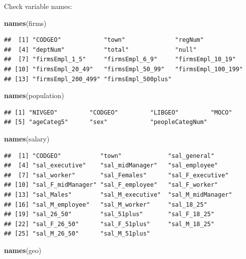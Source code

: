 \documentclass[]{article}
\newenvironment{Shaded}{\begin{snugshade}}{\end{snugshade}}
\newcommand{\KeywordTok}[1]{\textcolor[rgb]{0.13,0.29,0.53}{\textbf{#1}}}
\newcommand{\NormalTok}[1]{#1}
\begin{document}
Check variable names:

\begin{Shaded}
\begin{Highlighting}[]
\KeywordTok{names}\NormalTok{(firms) }
\end{Highlighting}
\end{Shaded}

\begin{verbatim}
##  [1] "CODGEO"            "town"              "regNum"           
##  [4] "deptNum"           "total"             "null"             
##  [7] "firmsEmpl_1_5"     "firmsEmpl_6_9"     "firmsEmpl_10_19"  
## [10] "firmsEmpl_20_49"   "firmsEmpl_50_99"   "firmsEmpl_100_199"
## [13] "firmsEmpl_200_499" "firmsEmpl_500plus"
\end{verbatim}

\begin{Shaded}
\begin{Highlighting}[]
\KeywordTok{names}\NormalTok{(population)}
\end{Highlighting}
\end{Shaded}

\begin{verbatim}
## [1] "NIVGEO"         "CODGEO"         "LIBGEO"         "MOCO"          
## [5] "ageCateg5"      "sex"            "peopleCategNum"
\end{verbatim}

\begin{Shaded}
\begin{Highlighting}[]
\KeywordTok{names}\NormalTok{(salary)}
\end{Highlighting}
\end{Shaded}

\begin{verbatim}
##  [1] "CODGEO"           "town"             "sal_general"     
##  [4] "sal_executive"    "sal_midManager"   "sal_employee"    
##  [7] "sal_worker"       "sal_Females"      "sal_F_executive" 
## [10] "sal_F_midManager" "sal_F_employee"   "sal_F_worker"    
## [13] "sal_Males"        "sal_M_executive"  "sal_M_midManager"
## [16] "sal_M_employee"   "sal_M_worker"     "sal_18_25"       
## [19] "sal_26_50"        "sal_51plus"       "sal_F_18_25"     
## [22] "sal_F_26_50"      "sal_F_51plus"     "sal_M_18_25"     
## [25] "sal_M_26_50"      "sal_M_51plus"
\end{verbatim}

\begin{Shaded}
\begin{Highlighting}[]
\KeywordTok{names}\NormalTok{(geo)}
\end{Highlighting}
\end{Shaded}
\end{document}
